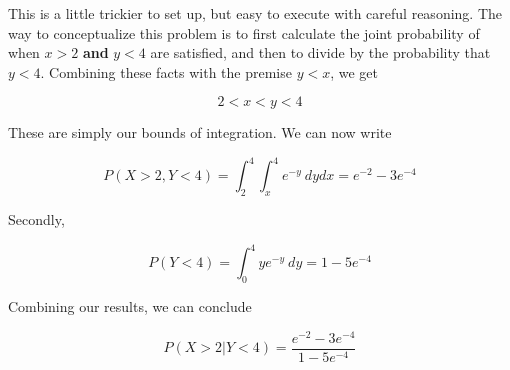 \documentclass[10pt, oneside]{article}   	%
\theoremstyle{definition}
\begin{document}
\begin{enumerate}[label=6.\arabic*]
\begin{enumerate}
	This is a little trickier to set up, but easy to execute with careful reasoning. The way to conceptualize this problem is to first calculate the joint probability of when $x > 2$ \textbf{and} $y < 4$ are satisfied, and then to divide by the probability that $y < 4$. Combining these facts with the premise $y < x$, we get
	
	\[ 2 < x < y < 4 \]
	
	These are simply our bounds of integration. We can now write
	
	\[ P(X > 2, Y < 4) = \int^4_2 \int^4_x e^{-y} \ dy dx = e^{-2} -3e^{-4}  \]
	
	Secondly, 
	
	\[ P(Y < 4) = \int^4_0 y e^{-y} \ dy = 1 - 5 e^{-4} \]
	
	Combining our results, we can conclude
	
	\[ \boxed{ P(X > 2 | Y < 4) = \frac{e^{-2} - 3e^{-4} }{1 - 5e^{-4}} } \]

\end{enumerate}

\end{enumerate}
\end{document}
